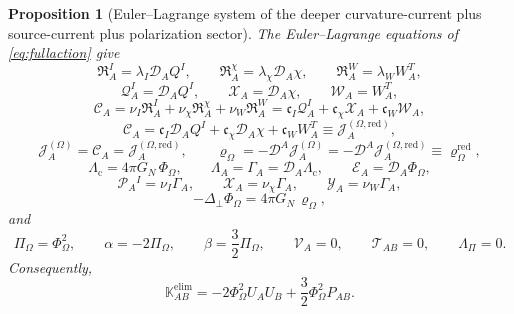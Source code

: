 \documentclass[11pt]{article}
\newcommand{\ProjSub}{P}
\newcommand{\SpatialD}{\mathcal D}
\newcommand{\LapPerp}{\Delta_\perp}
\newcommand{\FlowPot}{\Phi_\Omega}
\newcommand{\BalanceField}{\Pi_\Omega}
\newcommand{\BalMult}{\Lambda_\Pi}
\newcommand{\SourceDensity}{\varrho_\Omega}
\newcommand{\SourceDensityRed}{\varrho_\Omega^{\mathrm{red}}}
\newcommand{\SourceCurrent}{\mathcal J^{(\Omega)}}
\newcommand{\SourceCurrentRed}{\mathcal J^{(\Omega,\mathrm{red})}}
\newcommand{\ConstCurrent}{\mathcal C}
\newcommand{\QCarrier}{\mathcal Q}
\newcommand{\ChiCarrier}{\mathcal X}
\newcommand{\TransCarrier}{\mathcal W}
\newcommand{\ContMult}{\Lambda_{\mathrm c}}
\newcommand{\CurrentMult}{\Lambda}
\newcommand{\ConstGamma}{\Gamma}
\newcommand{\CurvQMult}{\mathscr P}
\newcommand{\CurvChiMult}{\mathscr X}
\newcommand{\CurvTransMult}{\mathscr Y}
\newcommand{\SourceFlux}{\mathcal E}
\newcommand{\AuxPol}{\mathbb K}
\newtheorem{proposition}{Proposition}
\begin{document}
\begin{proposition}[Euler--Lagrange system of the deeper curvature-current plus source-current plus polarization sector]
\label{prop:EL}
The Euler--Lagrange equations of \eqref{eq:fullaction} give
\begin{equation}
\mathfrak R_A^I=\lambda_I\SpatialD_AQ^I,
\qquad
\mathfrak R_A^\chi=\lambda_\chi\SpatialD_A\chi,
\qquad
\mathfrak R_A^W=\lambda_WW_A^T,
\label{eq:Rrels}
\end{equation}
\begin{equation}
\QCarrier_A^I=\SpatialD_AQ^I,
\qquad
\ChiCarrier_A=\SpatialD_A\chi,
\qquad
\TransCarrier_A=W_A^T,
\label{eq:carrierrels}
\end{equation}
\begin{equation}
\ConstCurrent_A
=
\nu_I\mathfrak R_A^I
+\nu_\chi\mathfrak R_A^\chi
+\nu_W\mathfrak R_A^W
=
\mathfrak c_I\QCarrier_A^I
+\mathfrak c_\chi\ChiCarrier_A
+\mathfrak c_W\TransCarrier_A,
\label{eq:constitutivecarrier}
\end{equation}
\begin{equation}
\ConstCurrent_A
=
\mathfrak c_I\SpatialD_AQ^I
+\mathfrak c_\chi\SpatialD_A\chi
+\mathfrak c_WW_A^T
\equiv
\SourceCurrentRed_A,
\label{eq:Jredexplicit}
\end{equation}
\begin{equation}
\SourceCurrent_A=\ConstCurrent_A=\SourceCurrentRed_A,
\qquad
\SourceDensity=-\SpatialD^A\SourceCurrent_A=-\SpatialD^A\SourceCurrentRed_A\equiv \SourceDensityRed,
\label{eq:currenteqs}
\end{equation}
\begin{equation}
\ContMult=4\pi G_N\,\FlowPot,
\qquad
\CurrentMult_A=\ConstGamma_A=\SpatialD_A\ContMult,
\qquad
\SourceFlux_A=\SpatialD_A\FlowPot,
\label{eq:multflux}
\end{equation}
\begin{equation}
\CurvQMult_A{}^{I}=\nu_I\ConstGamma_A,
\qquad
\CurvChiMult_A=\nu_\chi\ConstGamma_A,
\qquad
\CurvTransMult_A=\nu_W\ConstGamma_A,
\label{eq:curv_mults}
\end{equation}
\begin{equation}
-\LapPerp\FlowPot=4\pi G_N\,\SourceDensity,
\label{eq:poisson}
\end{equation}
and
\begin{equation}
\BalanceField=\FlowPot^2,
\qquad
\alpha=-2\BalanceField,
\qquad
\beta=\frac32\BalanceField,
\qquad
\mathcal V_A=0,
\qquad
\mathcal T_{AB}=0,
\qquad
\BalMult=0.
\label{eq:poleqs}
\end{equation}
Consequently,
\begin{equation}
\AuxPol_{AB}^{\mathrm{elim}}
=
-2\FlowPot^2U_AU_B
+\frac32\FlowPot^2\ProjSub_{AB}.
\label{eq:Kelim}
\end{equation}
\end{proposition}
\end{document}

